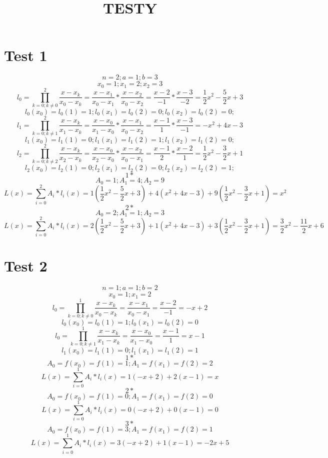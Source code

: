 \documentclass [12pt,fleqn] {article}
\title{\textbf{TESTY}}
\begin{document}
\section*{Test 1}
\[n=2; a=1; b=3 \]
\[x_0=1; x_1=2; x_2=3\]
\[l_0=\prod\limits_{k=0;k\neq0}^2\frac{x-x_k}{x_0-x_k}=\frac{x-x_1}{x_0-x_1}*\frac{x-x_2}{x_0-x_2}=\frac{x-2}{-1}*\frac{x-3}{-2}=\frac{1}{2}x^2-\frac{5}{2}x+3\]
\[l_0(x_0)=l_0(1)=1; l_0(x_1)=l_0(2)=0; l_0(x_2)=l_0(2)=0;\]
\[l_1=\prod\limits_{k=0;k\neq1}^2\frac{x-x_k}{x_1-x_k}=\frac{x-x_0}{x_1-x_0}*\frac{x-x_1}{x_0-x_2}=\frac{x-1}{1}*\frac{x-3}{-1}=-x^2+4x-3\]
\[l_1(x_0)=l_1(1)=0; l_1(x_1)=l_1(2)=1; l_1(x_2)=l_1(2)=0;\]
\[l_2=\prod\limits_{k=0;k\neq2}^2\frac{x-x_k}{x_2-x_k}=\frac{x-x_0}{x_2-x_0}*\frac{x-x_2}{x_0-x_1}=\frac{x-1}{2}*\frac{x-2}{1}=\frac{1}{2}x^2-\frac{3}{2}x+1\]
\[l_2(x_0)=l_2(1)=0; l_2(x_1)=l_2(2)=0; l_2(x_2)=l_2(2)=1;\]
\[1*\]
\[A_0=1; A_1=4; A_2=9\]
\[L(x)=\sum\limits_{i=0}^2A_i*l_i(x)=1(\frac{1}{2}x^2-\frac{5}{2}x+3)+4(x^2+4x-3)+9(\frac{1}{2}x^2-\frac{3}{2}x+1)=x^2\]
\[2*\]
\[A_0=2; A_1=1; A_2=3\]
\[L(x)=\sum\limits_{i=0}^2A_i*l_i(x)=2(\frac{1}{2}x^2-\frac{5}{2}x+3)+1(x^2+4x-3)+3(\frac{1}{2}x^2-\frac{3}{2}x+1)=\frac{3}{2}x^2-\frac{11}{2}x+6\]
\newpage
\section*{Test 2}
\[n=1; a=1; b=2\]
\[x_0=1; x_1=2\]
\[l_0=\prod\limits_{k=0;k\neq0}^1\frac{x-x_k}{x_0-x_k}=\frac{x-x_1}{x_0-x_1}=\frac{x-2}{-1}=-x+2\]
\[l_0(x_0)=l_0(1)=1; l_0(x_1)=l_0(2)=0\]
\[l_0=\prod\limits_{k=0;k\neq1}^1\frac{x-x_k}{x_1-x_k}=\frac{x-x_0}{x_1-x_0}=\frac{x-1}{1}=x-1\]
\[l_1(x_0)=l_1(1)=0; l_1(x_1)=l_1(2)=1\]
\[1*\]
\[A_0=f(x_0)=f(1)=1; A_1=f(x_1)=f(2)=2\]
\[L(x)=\sum\limits_{i=0}^1A_i*l_i(x)=1(-x+2)+2(x-1)=x\]
\[2*\]
\[A_0=f(x_0)=f(1)=0; A_1=f(x_1)=f(2)=0\]
\[L(x)=\sum\limits_{i=0}^1A_i*l_i(x)=0(-x+2)+0(x-1)=0\]
\[3*\]
\[A_0=f(x_0)=f(1)=3; A_1=f(x_1)=f(2)=1\]
\[L(x)=\sum\limits_{i=0}^1A_i*l_i(x)=3(-x+2)+1(x-1)=-2x+5\]
\newpage
\end{document}
